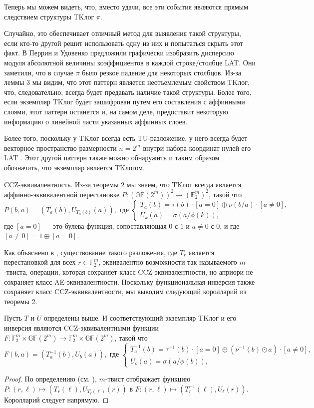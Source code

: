 Теперь мы можем видеть, что, вместо удачи, все эти события являются прямым следствием структуры TKлог \(\pi\).

Случайно, это обеспечивает отличный метод для выявления такой структуры, если кто-то другой решит использовать одну из них и попытаться скрыть этот факт. В \cite{PU16} Перрин и Удовенко предложили графически изобразить дисперсию модуля абсолютной величины коэффициентов в каждой строке/столбце LAT. Они заметили, что в случае \(\pi\) было резкое падение для некоторых столбцов. Из-за леммы 3 мы видим, что этот паттерн является неотъемлемым свойством TKлог, что, следовательно, всегда будет предавать наличие такой структуры. Более того, если экземпляр TKлог будет зашифрован путем его составления с аффинными слоями, этот паттерн останется и, на самом деле, предоставит некоторую информацию о линейной части указанных аффинных слоев.

Более того, поскольку у TKлог всегда есть TU-разложение, у него всегда будет векторное пространство размерности \(n = 2^m\) внутри набора координат нулей его LAT \cite{CP19}. Этот другой паттерн также можно обнаружить и таким образом обозначить, что экземпляр является TKлогом.

CCZ-эквивалентность. Из-за теоремы 2 мы знаем, что TKлог всегда является аффинно-эквивалентной перестановке \(P : (\mathbb{GF}(2^m))^2 \to (\mathbb{F}_2^m)^2\), такой что
\[
P(b, a) = \left(T_a(b), U_{T_a(b)}(a)\right), \text{ где }\left\{\begin{array}{l}
T_a(b) = \tau(b) \cdot [a = 0] \oplus \nu(b/a) \cdot [a \neq 0], \\
U_k(a) = \sigma(a/\phi(k)),
\end{array}\right.
\]
где \([a = 0]\) — это булева функция, сопоставляющая \(0\) с \(1\) и \(a \neq 0\) с \(0\), и где \([a \neq 0] = 1 \oplus [a = 0]\).

Как объяснено в \cite{CP19}, существование такого разложения, где \(T_r\) является перестановкой для всех \(r \in \mathbb{F}_2^m\), эквивалентно возможности так называемого \(m\)-твиста, операции, которая сохраняет класс CCZ-эквивалентности, но априори не сохраняет класс AE-эквивалентности. Поскольку функциональная инверсия также сохраняет класс CCZ-эквивалентности, мы выводим следующий королларий из теоремы 2.
\begin{corollary}
Пусть \(T\) и \(U\) определены выше. И соответствующий экземпляр TKлог и его инверсия являются CCZ-эквивалентными функции \(F : \mathbb{F}_2^m \times \mathbb{GF}(2^m) \to \mathbb{F}_2^m \times \mathbb{GF}(2^m)\), такой что
\[
F(b, a) = \left(T_a^{-1}(b), U_b(a)\right), \text{ где }\left\{\begin{array}{l}
T_a^{-1}(b) = \tau^{-1}(b) \cdot [a = 0] \oplus \left(\nu^{-1}(b) \odot a\right) \cdot [a \neq 0], \\
U_b(a) = \sigma(a/\phi(b)),
\end{array}\right.
\]
\end{corollary}
\begin{proof}
По определению (см. \cite{CP19}), \(m\)-твист отображает функцию \(P : (r, \ell) \mapsto \left(T_r(\ell), U_{T_r(\ell)}(r)\right)\) в \(F : (r, \ell) \mapsto \left(T_r^{-1}(\ell), U_{\ell}(r)\right)\). Королларий следует напрямую.
\end{proof}

